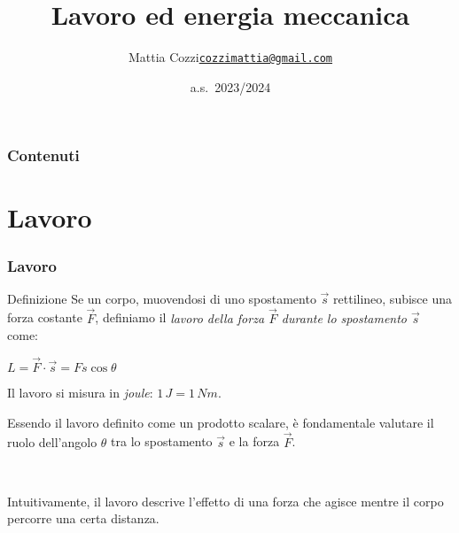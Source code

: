 \documentclass[]{beamer}
\title{Lavoro ed energia meccanica}
\author{\texorpdfstring{Mattia Cozzi\newline\href{mailto:cozzimattia@gmail.com}{\texttt{cozzimattia@gmail.com}}}{Mattia Cozzi}}
\date{a.s.~2023/2024}
\theoremstyle{plain}
\begin{document}
\begin{frame}
  \titlepage
\end{frame}





\begin{frame}
\frametitle{Contenuti}
\tableofcontents
\end{frame}


\section{Lavoro}


\begin{frame}
  \frametitle{Lavoro}
  \begin{block}{Definizione}
Se un corpo, muovendosi di uno spostamento $ \vec{s} $ rettilineo, subisce una forza costante $ \vec{F} $, definiamo il \emph{lavoro della forza $ \vec{F} $ durante lo spostamento $ \vec{s} $} come:
\begin{center}
\colorbox{blue!30}{$ L = \vec{F} \cdot \vec{s} = Fs\cos\theta $}
\end{center}
Il lavoro si misura in \emph{joule}: $ 1 \, J = 1 \, Nm $.
\end{block}\pause
Essendo il lavoro definito come un prodotto scalare, è fondamentale valutare il \alert<2>{ruolo dell'angolo $ \theta $} tra lo spostamento $ \vec{s} $ e la forza $ \vec{F} $.\pause

~

Intuitivamente, il lavoro descrive \alert<3>{l'effetto di una forza che agisce mentre il corpo percorre una certa distanza}.
\end{frame}
\end{document}
